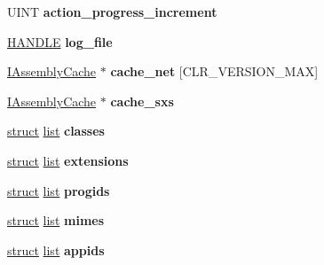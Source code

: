 \begin{DoxyCompactItemize}
\item 
\mbox{\label{structtag_m_s_i_p_a_c_k_a_g_e_a9f0e67a58ea58b6f7aff4310172f8b3a}} 
U\+I\+NT {\bfseries action\+\_\+progress\+\_\+increment}
\item 
\mbox{\label{structtag_m_s_i_p_a_c_k_a_g_e_ab3935a88451948039a6601e37b8df44e}} 
\hyperlink{interfacevoid}{H\+A\+N\+D\+LE} {\bfseries log\+\_\+file}
\item 
\mbox{\label{structtag_m_s_i_p_a_c_k_a_g_e_a7bc345f0ebfaa2690cd4342b59b14a06}} 
\hyperlink{interface_i_assembly_cache}{I\+Assembly\+Cache} $\ast$ {\bfseries cache\+\_\+net} \mbox{[}C\+L\+R\+\_\+\+V\+E\+R\+S\+I\+O\+N\+\_\+\+M\+AX\mbox{]}
\item 
\mbox{\label{structtag_m_s_i_p_a_c_k_a_g_e_a6a60fbfdb9dbd8c0da34369e0c0290aa}} 
\hyperlink{interface_i_assembly_cache}{I\+Assembly\+Cache} $\ast$ {\bfseries cache\+\_\+sxs}
\item 
\mbox{\label{structtag_m_s_i_p_a_c_k_a_g_e_a3bc43625c3aca39f097ddb714479bb4f}} 
\hyperlink{interfacestruct}{struct} \hyperlink{classlist}{list} {\bfseries classes}
\item 
\mbox{\label{structtag_m_s_i_p_a_c_k_a_g_e_a7dad44b0470c79f64cb2ad719c656d9c}} 
\hyperlink{interfacestruct}{struct} \hyperlink{classlist}{list} {\bfseries extensions}
\item 
\mbox{\label{structtag_m_s_i_p_a_c_k_a_g_e_a1831665baf0a5d6a323a7b1c2e3a3d62}} 
\hyperlink{interfacestruct}{struct} \hyperlink{classlist}{list} {\bfseries progids}
\item 
\mbox{\label{structtag_m_s_i_p_a_c_k_a_g_e_a9cee3a023c8d348f9dbeba71d44056bc}} 
\hyperlink{interfacestruct}{struct} \hyperlink{classlist}{list} {\bfseries mimes}
\item 
\mbox{\label{structtag_m_s_i_p_a_c_k_a_g_e_a4650042ddeb37ba5e2eea9da78bbd5b8}} 
\hyperlink{interfacestruct}{struct} \hyperlink{classlist}{list} {\bfseries appids}

\end{DoxyCompactItemize}
